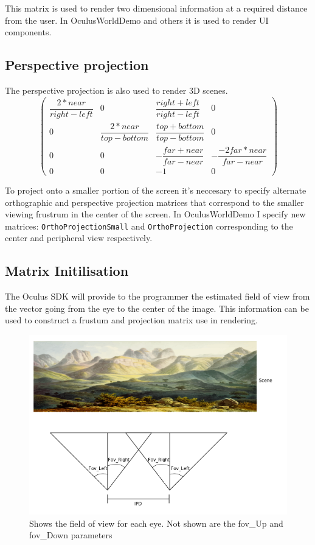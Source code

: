 \documentclass[12pt,a4paper,twoside,openright]{report}
\begin{document}
This matrix is used to render two dimensional information at a required distance from the user. In OculusWorldDemo and others it is used to render UI components.
\subsection{Perspective projection}

The perspective projection is also used to render 3D scenes.
\[
\begin{pmatrix}
\dfrac{2*near}{right-left} & 0 & \dfrac{right + left}{right - left} & 0 \\
0 & \dfrac{2*near}{top-bottom} & \dfrac{top+bottom}{top-bottom} & 0 \\
0 & 0 & -\dfrac{far + near}{far-near} & -\dfrac{-2far*near}{far-near} \\
0 & 0 & -1 & 0
\end{pmatrix}
\]

To project onto a smaller portion of the screen it's neccesary to specify alternate orthographic and perspective projection matrices that correspond to the smaller viewing frustrum in the center of the screen. In OculusWorldDemo I specify new matrices: \texttt{OrthoProjectionSmall} and \texttt{OrthoProjection} corresponding to the center and peripheral view respectively. 

\subsection{Matrix Initilisation}\label{matrix}

The Oculus SDK will provide to the programmer the estimated field of view from the vector going from the eye to the center of the image. This information can be used to construct a frustum and projection matrix use in rendering.

\begin{figure}[tbh]
\centerline{\includegraphics[scale=0.6]{figs/asymmetrical_fov.png}}
\caption{Shows the field of view for each eye. Not shown are the fov\_Up and fov\_Down parameters}
\label{epsfig1}
\end{figure}
\end{document}

